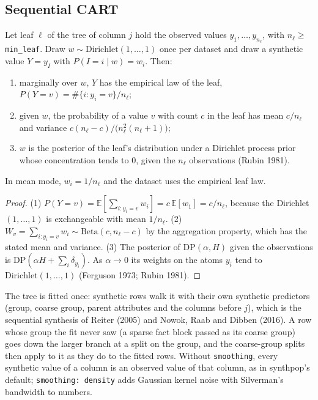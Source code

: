 \subsection{Sequential CART}
\begin{proposition}\label{prop:cartbb}
Let leaf $\ell$ of the tree of column $j$ hold the observed values $y_1,\dots,y_{n_\ell}$, with
$n_\ell\ge$\,\texttt{min\_leaf}. Draw $w\sim\mathrm{Dirichlet}(1,\dots,1)$ once per dataset and draw a synthetic
value $Y=y_I$ with $P(I=i\mid w)=w_i$. Then:
\begin{enumerate}
\item marginally over $w$, $Y$ has the empirical law of the leaf, $P(Y=v)=\#\{i:y_i=v\}/n_\ell$;
\item given $w$, the probability of a value $v$ with count $c$ in the leaf has mean $c/n_\ell$ and variance
$c(n_\ell-c)/\bigl(n_\ell^2(n_\ell+1)\bigr)$;
\item $w$ is the posterior of the leaf's distribution under a Dirichlet process prior whose concentration tends to 0,
given the $n_\ell$ observations (Rubin 1981).
\end{enumerate}
In mean mode, $w_i=1/n_\ell$ and the dataset uses the empirical leaf law.
\end{proposition}
\begin{proof}
(1) $P(Y=v)=\mathbb E[\sum_{i:y_i=v}w_i]=c\,\mathbb E[w_1]=c/n_\ell$, because the Dirichlet$(1,\dots,1)$ is
exchangeable with mean $1/n_\ell$. (2) $W_v=\sum_{i:y_i=v}w_i\sim\mathrm{Beta}(c,n_\ell-c)$ by the aggregation
property, which has the stated mean and variance. (3) The posterior of $\mathrm{DP}(\alpha,H)$ given the
observations is $\mathrm{DP}(\alpha H+\sum_i\delta_{y_i})$. As $\alpha\to0$ its weights on the atoms $y_i$ tend to
$\mathrm{Dirichlet}(1,\dots,1)$ (Ferguson 1973; Rubin 1981).
\end{proof}
\noindent The tree is fitted once: synthetic rows walk it with their own synthetic predictors (group, coarse group,
parent attributes and the columns before $j$), which is the sequential synthesis of Reiter (2005) and Nowok, Raab and
Dibben (2016). A row whose group the fit never saw (a sparse fact block passed as its coarse group) goes down the
larger branch at a split on the group, and the coarse-group splits then apply to it as they do to the fitted rows.
Without \texttt{smoothing}, every synthetic value of a column is an observed value of that column, as in synthpop's
default; \texttt{smoothing: density} adds Gaussian kernel noise with Silverman's bandwidth to numbers.
\setcounter{proposition}{\value{savedpropgen}}
